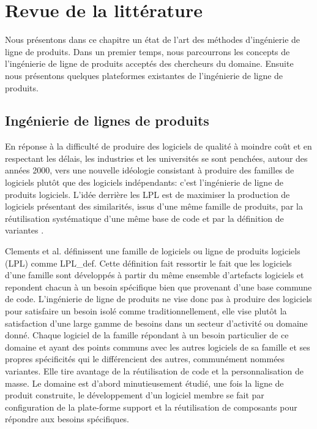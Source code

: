\chapter{Revue de la littérature}
Nous présentons dans ce chapitre un état de l’art des méthodes d'ingénierie de ligne de produits. Dans un premier temps, nous parcourrons les concepts de l'ingénierie de ligne de produits acceptés des chercheurs du domaine. Ensuite nous présentons quelques plateformes existantes de l'ingénierie de ligne de produits. 

\section{Ingénierie de lignes de produits}
En réponse à la difficulté de produire des logiciels de qualité à moindre coût et en respectant les délais, les industries et les universités se sont penchées, autour des années 2000, vers une nouvelle idéologie consistant à produire des familles de logiciels plutôt que des logiciels indépendants: c'est l'ingénierie de ligne de produits logiciels. L’idée derrière les LPL est de maximiser la production de logiciels présentant des similarités, issus d’une même famille de produits, par la réutilisation systématique d’une même base de code et par la définition de variantes \cite{Urli2015}. 

Clements et al. \cite{Clements2002} définissent une famille de logiciels ou ligne de produits logiciels (LPL) comme \glsdesc{LPL_def}. Cette définition fait ressortir le fait que les logiciels d'une famille sont développés à partir du même ensemble d’artefacts logiciels et repondent chacun à un besoin spécifique bien que provenant d'une base commune de code. L’ingénierie de ligne de produits ne vise donc pas à produire des logiciels pour satisfaire un besoin isolé comme traditionnellement, elle vise plutôt la satisfaction d'une large gamme de besoins dans un secteur d'activité ou domaine donné. Chaque logiciel de la famille répondant à un besoin particulier de ce domaine et ayant des points communs avec les autres logiciels de sa famille et ses propres spécificités qui le différencient des autres, communément nommées variantes. Elle tire avantage de la réutilisation de code et la personnalisation de masse. Le domaine est d'abord minutieusement étudié, une fois la ligne de produit construite, le développement d'un logiciel membre se fait par configuration de la plate-forme support et la réutilisation de composants pour répondre aux besoins spécifiques.

